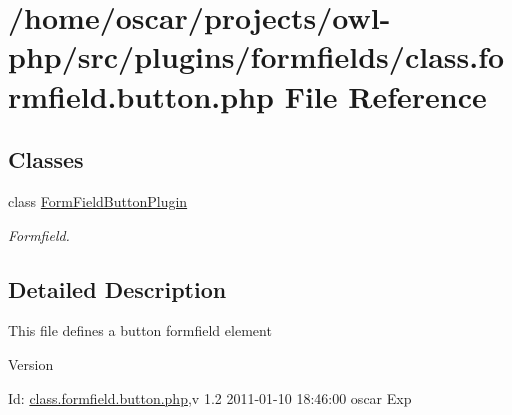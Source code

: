 \section{/home/oscar/projects/owl-\/php/src/plugins/formfields/class.formfield.button.php File Reference}
\label{class_8formfield_8button_8php}
\subsection*{Classes}
\begin{DoxyCompactItemize}
\item 
class \hyperlink{classFormFieldButtonPlugin}{FormFieldButtonPlugin}
\begin{DoxyCompactList}\small\item\em Formfield. \item\end{DoxyCompactList}\end{DoxyCompactItemize}


\subsection{Detailed Description}
This file defines a button formfield element \begin{DoxyVersion}{Version}

\end{DoxyVersion}
\begin{DoxyParagraph}{Id:}
\hyperlink{class_8formfield_8button_8php}{class.formfield.button.php},v 1.2 2011-\/01-\/10 18:46:00 oscar Exp 
\end{DoxyParagraph}
